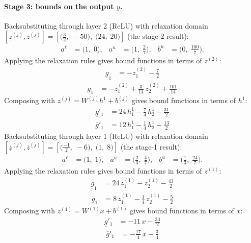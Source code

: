 \documentclass[11pt]{article}
\begin{document}
\paragraph{Stage 3: bounds on the output $y$.}
Backsubstituting through layer 2 (ReLU) with relaxation domain $[\underline{z}^{(j)}, \overline{z}^{(j)}] = [\bigl(\frac{3}{2},\; -50\bigr),\; \bigl(24,\; 20\bigr)]$ (the stage-2 result):
\begin{align*}
a^{\ell} &= \bigl(1,\; 0\bigr), & a^{u} &= \bigl(1,\; \frac{2}{7}\bigr), & b^{u} &= \bigl(0,\; \frac{100}{7}\bigr).
\end{align*}
Applying the relaxation rules gives bound functions in terms of $z^{(2)}$:
\begin{align*}
\underline{g}_{1} &= -z^{(2)}_{1} - \frac{7}{2}
\end{align*}
\begin{align*}
\overline{g}_{1} &= -z^{(2)}_{1} + \frac{3}{14}\,z^{(2)}_{2} + \frac{101}{14}
\end{align*}
Composing with $z^{(j)} = W^{(j)} h^{1} + b^{(j)}$ gives bound functions in terms of $h^{1}$:
\begin{align*}
\underline{g}'_{1} &= 24\,h^{1}_{1} - \frac{7}{4}\,h^{1}_{2} - \frac{31}{2}
\end{align*}
\begin{align*}
\overline{g}'_{1} &= 12\,h^{1}_{1} - \frac{1}{4}\,h^{1}_{2} - \frac{13}{2}
\end{align*}
Backsubstituting through layer 1 (ReLU) with relaxation domain $[\underline{z}^{(j)}, \overline{z}^{(j)}] = [\bigl(\frac{-1}{2},\; -6\bigr),\; \bigl(1,\; 8\bigr)]$ (the stage-1 result):
\begin{align*}
a^{\ell} &= \bigl(1,\; 1\bigr), & a^{u} &= \bigl(\frac{2}{3},\; \frac{4}{7}\bigr), & b^{u} &= \bigl(\frac{1}{3},\; \frac{24}{7}\bigr).
\end{align*}
Applying the relaxation rules gives bound functions in terms of $z^{(1)}$:
\begin{align*}
\underline{g}_{1} &= 24\,z^{(1)}_{1} - z^{(1)}_{2} - \frac{43}{2}
\end{align*}
\begin{align*}
\overline{g}_{1} &= 8\,z^{(1)}_{1} - \frac{1}{4}\,z^{(1)}_{2} - \frac{5}{2}
\end{align*}
Composing with $z^{(1)} = W^{(1)} x + b^{(1)}$ gives bound functions in terms of $x$:
\begin{align*}
\underline{g}'_{1} &= -11\,x - \frac{33}{2}
\end{align*}
\begin{align*}
\overline{g}'_{1} &= -\frac{17}{4}\,x - \frac{3}{4}
\end{align*}
\end{document}
